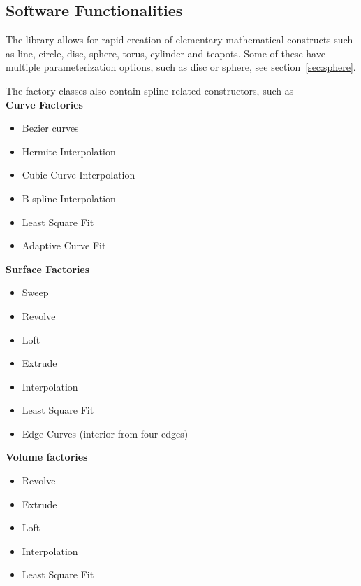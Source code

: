 \documentclass[preprint,12pt, a4paper]{elsarticle}
\begin{document}
\subsection{Software Functionalities}
\label{sec:functionality}

The library allows for rapid creation of elementary mathematical constructs such as line, circle, disc, sphere, torus, cylinder and teapots.
Some of these have multiple parameterization options, such as disc or sphere, see section~\ref{sec:sphere}.

The factory classes also contain spline-related constructors, such as \\
\textbf{Curve Factories}
\begin{itemize}
    \setlength\itemsep{-.5em}
    \item Bezier curves
    \item Hermite Interpolation
    \item Cubic Curve Interpolation
    \item B-spline Interpolation
    \item Least Square Fit
    \item Adaptive Curve Fit
\end{itemize}
\textbf{Surface Factories}
\begin{itemize}
    \setlength\itemsep{-.5em}
    \item Sweep
    \item Revolve
    \item Loft
    \item Extrude
    \item Interpolation
    \item Least Square Fit
    \item Edge Curves (interior from four edges)
\end{itemize}
\textbf{Volume factories}
\begin{itemize}
    \setlength\itemsep{-.5em}
    \item Revolve
    \item Extrude
    \item Loft
    \item Interpolation
    \item Least Square Fit
\end{itemize}
\end{document}
